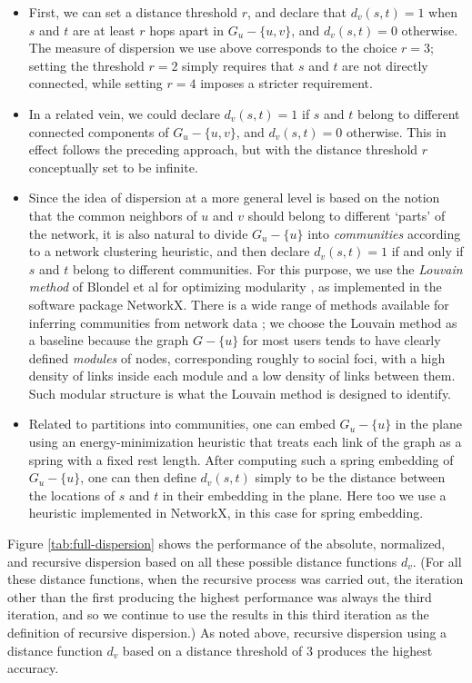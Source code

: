 \documentclass{sigchi}
\begin{document}
\begin{itemize}
\item First, we can set a distance threshold $r$, and declare
that $d_v(s,t) = 1$ when $s$ and $t$ are at least $r$ hops apart
in $G_u - \{u, v\}$, and $d_v(s,t) = 0$ otherwise.
The measure of dispersion we use above corresponds 
to the choice $r = 3$; setting the threshold $r = 2$ simply requires
that $s$ and $t$ are not directly connected, while setting $r = 4$
imposes a stricter requirement.
\item In a related vein, we could declare $d_v(s,t) = 1$ if $s$ and $t$
belong to different connected components of $G_u - \{u, v\}$,
and $d_v(s,t) = 0$ otherwise.
This in effect follows the preceding approach, but with the 
distance threshold $r$ conceptually set to be infinite.
\item Since the idea of
dispersion at a more general level is based on the notion that the 
common neighbors of $u$ and $v$ should belong to different `parts'
of the network, it is also natural to divide $G_u - \{u\}$ into
{\em communities} according to a network clustering heuristic, 
and then declare $d_v(s,t) = 1$ if and only if
$s$ and $t$ belong to different communities.
For this purpose, we use the {\em Louvain method}
of Blondel et al
for optimizing
modularity
\cite{blondel-louvain-method},
as implemented in the software package NetworkX.
There is a wide range of methods available for inferring
communities from network data \cite{newman-sirev};
we choose the Louvain method as a baseline because the 
graph $G - \{u\}$ for most users
tends to have clearly defined {\em modules} of nodes,
corresponding roughly to social foci, with a high density of links
inside each module and a low density of links between them.
Such modular structure is what the Louvain method is designed to identify.
\item Related to partitions into communities, one can embed 
$G_u -\{u\}$ in the plane using an energy-minimization heuristic that
treats each link of the graph as a spring with a fixed rest length.
After computing such a spring embedding of $G_u - \{u\}$, one can then
define $d_v(s,t)$ simply to be the distance between the locations
of $s$ and $t$ in their embedding in the plane.
Here too we use a heuristic implemented in NetworkX, in this
case for spring embedding.
\end{itemize}

Figure \ref{tab:full-dispersion} shows the performance of 
the absolute, normalized, and recursive dispersion based on
all these possible distance functions $d_v$.
(For all these distance functions, when the recursive process
was carried out, the iteration other than the first producing the highest
performance was always the third iteration, and so we continue to use the
results in this third iteration as the definition of recursive dispersion.)
As noted above, recursive dispersion using
a distance function $d_v$ based on a distance threshold of $3$
produces the highest accuracy.  
\end{document}
